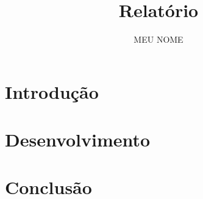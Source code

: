 \documentclass{article}
\begin{document}
\title{Relatório}
\author{MEU NOME}
\date{}

\maketitle

\section{Introdução}

\section{Desenvolvimento}

\section{Conclusão}
\end{document}
